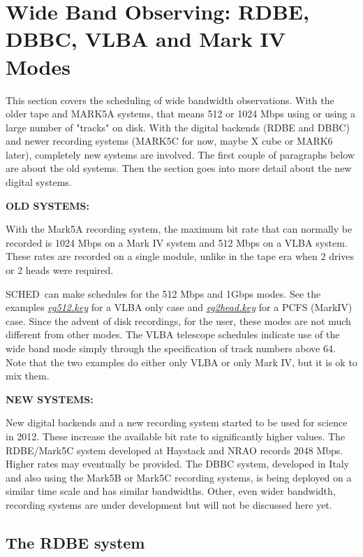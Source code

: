 \documentclass{report}
\newcommand{\schedb}{{\sc SCHED~}}
\begin{document}
\section{\label{SEC:WIDE}Wide Band Observing: RDBE, DBBC, VLBA and
Mark IV Modes}

This section covers the scheduling of wide bandwidth observations.
With the older tape and MARK5A systems, that means 512 or 1024 Mbps
using or using a large number of "tracks" on disk.  With the digital
backends (RDBE and DBBC) and newer recording systems (MARK5C for now,
maybe X cube or MARK6 later), completely new systems are involved.
The first couple of paragraphs below are about the old systems.  Then
the section goes into more detail about the new digital systems.

{\bf OLD SYSTEMS:}

With the Mark5A recording system, the maximum bit rate that can
normally be recorded is 1024 Mbps on a Mark IV system and 512 Mbps
on a VLBA system.  These rates are recorded on a single module, unlike
in the tape era when 2 drives or 2 heads were required.

\schedb can make schedules for the 512 Mbps and 1Gbps modes.  See the
examples 
{\href{examples/eg512.key}{{\sl eg512.key}}} for a
VLBA only case and 
{\href{examples/eg2head.key}{{\sl eg2head.key}}}
for a PCFS (MarkIV) case.  Since the
advent of disk recordings, for the
user, these modes are not much different from other modes.  The
VLBA telescope schedules indicate use of the wide band mode simply
through the specification of track numbers above 64.  Note that the
two examples do either only VLBA or only Mark IV, but it is ok to mix
them.

{\bf NEW SYSTEMS:}

New digital backends and a new recording system started to be used for
science in 2012.  These increase the available bit rate to
significantly higher values.  The RDBE/Mark5C system developed at
Haystack and NRAO records 2048 Mbps.  Higher rates may eventually be
provided.  The DBBC system, developed in Italy and also using the
Mark5B or Mark5C recording systems, is being deployed on a similar time
scale and has similar bandwidths.  Other, even wider bandwidth,
recording systems are under development but will not be discussed here
yet.

\subsection{\label{SSEC:RDBE}The RDBE system}
\end{document}
